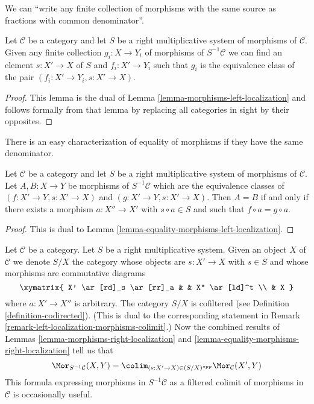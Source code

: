 \noindent
We can ``write any finite collection of morphisms with the same source
as fractions with common denominator''.

\begin{lemma}
\label{lemma-morphisms-right-localization}
Let $\mathcal{C}$ be a category and let $S$ be a right multiplicative
system of morphisms of $\mathcal{C}$. Given any finite collection
$g_i : X \to Y_i$ of morphisms of $S^{-1}\mathcal{C}$
we can find an element $s : X' \to X$ of $S$ and
$f_i : X' \to Y_i$ such that
$g_i$ is the equivalence class of the pair
$(f_i : X' \to Y_i, s : X' \to X)$.
\end{lemma}

\begin{proof}
This lemma is the dual of
Lemma \ref{lemma-morphisms-left-localization}
and follows formally from that lemma by replacing all
categories in sight by their opposites.
\end{proof}

\noindent
There is an easy characterization of equality of morphisms if they
have the same denominator.

\begin{lemma}
\label{lemma-equality-morphisms-right-localization}
Let $\mathcal{C}$ be a category and let $S$ be a right multiplicative
system of morphisms of $\mathcal{C}$. Let $A, B : X \to Y$ be
morphisms of $S^{-1}\mathcal{C}$ which are the equivalence
classes of $(f : X' \to Y, s : X' \to X)$ and
$(g : X' \to Y, s : X' \to X)$. Then
$A = B$ if and only if there exists a morphism
$a : X'' \to X'$ with $s \circ a \in S$ and
such that $f \circ a = g \circ a$.
\end{lemma}

\begin{proof}
This is dual to
Lemma \ref{lemma-equality-morphisms-left-localization}.
\end{proof}

\begin{remark}
\label{remark-right-localization-morphisms-colimit}
Let $\mathcal{C}$ be a category. Let $S$ be a right multiplicative system.
Given an object $X$ of $\mathcal{C}$ we denote $S/X$ the category whose
objects are $s : X' \to X$ with $s \in S$ and whose morphisms are
commutative diagrams
$$
\xymatrix{
X' \ar[rd]_s \ar[rr]_a & & X'' \ar[ld]^t \\
& X
}
$$
where $a : X' \to X''$ is arbitrary. The category
$S/X$ is cofiltered (see
Definition \ref{definition-codirected}).
(This is dual to the corresponding statement in
Remark \ref{remark-left-localization-morphisms-colimit}.)
Now the combined results of
Lemmas \ref{lemma-morphisms-right-localization} and
\ref{lemma-equality-morphisms-right-localization}
tell us that
\begin{equation}
\label{equation-right-localization-morphisms-colimit}
\Mor_{S^{-1}\mathcal{C}}(X, Y) =
\colim_{(s : X' \to X) \in (S/X)^{opp}} \Mor_\mathcal{C}(X', Y)
\end{equation}
This formula expressing morphisms in $S^{-1}\mathcal{C}$ as a filtered
colimit of morphisms in $\mathcal{C}$ is occasionally useful.
\end{remark}

